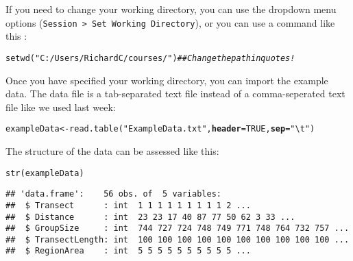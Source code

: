 \documentclass[12pt]{article}\usepackage[]{graphicx}\usepackage[]{xcolor}
\makeatletter
\newcommand{\hlnum}[1]{\textcolor[rgb]{0.69,0.494,0}{#1}}%
\newcommand{\hlsng}[1]{\textcolor[rgb]{0.749,0.012,0.012}{#1}}%
\newcommand{\hlcom}[1]{\textcolor[rgb]{0.514,0.506,0.514}{\textit{#1}}}%
\newcommand{\hldef}[1]{\textcolor[rgb]{0,0,0}{#1}}%
\newcommand{\hlkwb}[1]{\textcolor[rgb]{0,0.341,0.682}{#1}}%
\newcommand{\hlkwc}[1]{\textcolor[rgb]{0,0,0}{\textbf{#1}}}%
\newcommand{\hlkwd}[1]{\textcolor[rgb]{0.004,0.004,0.506}{#1}}%
\newenvironment{kframe}{%
 \def\at@end@of@kframe{}%
 \ifinner\ifhmode%
  \def\at@end@of@kframe{\end{minipage}}%
  \begin{minipage}{\columnwidth}%
 \fi\fi%
 \def\FrameCommand##1{\hskip\@totalleftmargin \hskip-\fboxsep
 \colorbox{shadecolor}{##1}\hskip-\fboxsep
     \hskip-\linewidth \hskip-\@totalleftmargin \hskip\columnwidth}%
 \MakeFramed {\advance\hsize-\width
   \@totalleftmargin\z@ \linewidth\hsize
   \@setminipage}}%
 {\par\unskip\endMakeFramed%
 \at@end@of@kframe}
\newenvironment{knitrout}{}{} %
\makeatother
\begin{document}
If you need to change your working directory, you can use the dropdown
menu options (\texttt{Session > Set Working Directory}), or you can
use a command like this : 

\begin{knitrout}
\color{fgcolor}\begin{kframe}
\begin{alltt}
\hlkwd{setwd}\hldef{(}\hlsng{"C:/Users/RichardC/courses/"}\hldef{)} \hlcom{## Change the path in quotes!}
\end{alltt}
\end{kframe}
\end{knitrout}

Once you have specified your working directory, you can import
the example data. The data file is a tab-separated text file
instead of a comma-seperated text file like we used last week:

\begin{knitrout}
\color{fgcolor}\begin{kframe}
\begin{alltt}
\hldef{exampleData} \hlkwb{<-} \hlkwd{read.table}\hldef{(}\hlsng{"ExampleData.txt"}\hldef{,} \hlkwc{header}\hldef{=}\hlnum{TRUE}\hldef{,} \hlkwc{sep}\hldef{=}\hlsng{"\textbackslash{}t"}\hldef{)}
\end{alltt}
\end{kframe}
\end{knitrout}



The structure of the data can be assessed like this:

\begin{knitrout}
\color{fgcolor}\begin{kframe}
\begin{alltt}
\hlkwd{str}\hldef{(exampleData)}
\end{alltt}
\begin{verbatim}
## 'data.frame':	56 obs. of  5 variables:
##  $ Transect      : int  1 1 1 1 1 1 1 1 1 2 ...
##  $ Distance      : int  23 23 17 40 87 77 50 62 3 33 ...
##  $ GroupSize     : int  744 727 724 748 749 771 748 764 732 757 ...
##  $ TransectLength: int  100 100 100 100 100 100 100 100 100 100 ...
##  $ RegionArea    : int  5 5 5 5 5 5 5 5 5 5 ...
\end{verbatim}
\end{kframe}
\end{knitrout}
\end{document}
